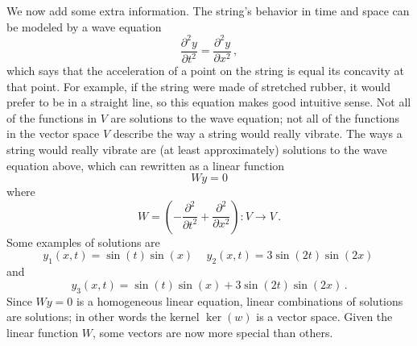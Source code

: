 \begin{example}
%
We now add some extra information.
The string's behavior in time and space can be modeled by a wave equation
$$\frac{\partial^2 y}{\partial t^2}=\frac{\partial^2 y}{\partial x^2}\, ,
$$
which says that the acceleration of a point on the string is equal its concavity at that point. For example, if the string were made of stretched rubber, it would 
prefer to be in a straight line, so this equation makes good intuitive sense. 
Not all of the functions in $V$ are solutions to the wave equation; not all of the functions in the vector space $V$ describe the way a string would really vibrate.  The ways a string  would really  vibrate are (at least approximately) solutions to the wave equation above, which can rewritten as a linear function
$$Wy=0$$
where
$$
W=\left(-\frac{\partial^2 }{\partial t^2}+\frac{\partial^2 }{\partial x^2}\right):V\rightarrow V\, .
$$
Some examples of solutions are 
$$
y_1(x,t)=\sin (t) \sin (x)\, \quad
y_2(x,t)=3\sin (2t) \sin (2x)\, $$
and
$$
y_3(x,t)=\sin (t) \sin (x)+3\sin (2t) \sin (2x)\, .
$$
Since $Wy=0$ is a homogeneous linear equation, linear combinations of solutions are solutions; in other words the kernel $\ker(w)$ is a vector space.
Given the linear function $W$, some vectors are now more special than others.


\end{example}
